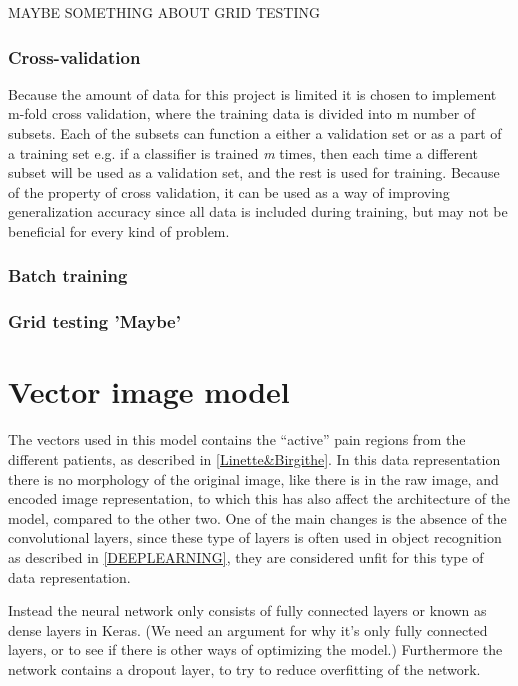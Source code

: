 MAYBE SOMETHING ABOUT GRID TESTING

\subsubsection{Cross-validation}
Because the amount of data for this project is limited it is chosen to implement m-fold cross validation, where the training data is divided into m number of subsets. Each of the subsets can function a either a validation set or as a part of a training set e.g. if a classifier is trained \textit{m} times, then each time a different subset will be used as a validation set, and the rest is used for training. \citep{Duda2000}
Because of the property of cross validation, it can be used as a way of improving generalization accuracy since all data is included during training, but may not be beneficial for every kind of problem. \citep{Duda2000}

\subsubsection{Batch training}


\subsubsection{Grid testing 'Maybe'}

\section{Vector image model}
The vectors used in this model contains the “active” pain regions from the different patients, as described in \autoref{Linette&Birgithe}. In this data representation there is no morphology of the original image, like there is in the raw image, and encoded image representation, to which this has also affect the architecture of the model, compared to the other two.
One of the main changes is the absence of the convolutional layers, since these type of layers is often used in object recognition as described in \autoref{DEEPLEARNING}, they are considered unfit for this type of data representation.    

Instead the neural network only consists of fully connected layers or known as dense layers in Keras. (We need an argument for why it’s only fully connected layers, or to see if there is other ways of optimizing the model.)
Furthermore the network contains a dropout layer, to try to reduce overfitting of the network. 



